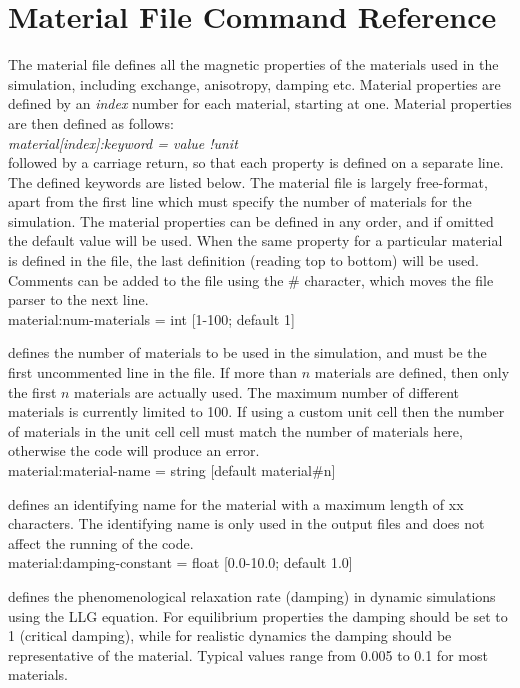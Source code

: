 
\chapter{Material File Command Reference}\label{chap:MaterialFileCommandReference}
The material file defines all the magnetic properties of the materials used in the simulation, including exchange, anisotropy, damping etc. Material properties are defined by an \textit{index} number for each material, starting at one. Material properties are then defined as follows:\\

\textit{material[index]:keyword = value !unit}\\

\noindent followed by a carriage return, so that each property is defined on a separate line. The defined keywords are listed below. The material file is largely free-format, apart from the first line which must specify the number of materials for the simulation. The material properties can be defined in any order, and if omitted the default value will be used. When the same property for a particular material is defined in the file, the last definition (reading top to bottom) will be used. Comments can be added to the file using the \# character, which moves the file parser to the next line.\\

{\zicf material:num-materials = int [1-100; default 1]} 
defines the number of materials to be used in the simulation, and must be the first uncommented line in the file. If more than $n$ materials are defined, then only the first $n$ materials are actually used. The maximum number of different materials is currently limited to 100. If using a custom unit cell then the number of materials in the unit cell cell must match the number of materials here, otherwise the code will produce an error.\\

{\zicf material:material-name = string [default material\#n]} 
defines an identifying name for the material with a maximum length of xx characters. The identifying name is only used in the output files and does not affect the running of the code.\\

{\zicf material:damping-constant = float [0.0-10.0; default 1.0]} defines the phenomenological relaxation rate (damping) in dynamic simulations using the LLG equation. For equilibrium properties the damping should be set to 1 (critical damping), while for realistic dynamics the damping should be representative of the material. Typical values range from 0.005 to 0.1 for most materials.\\

